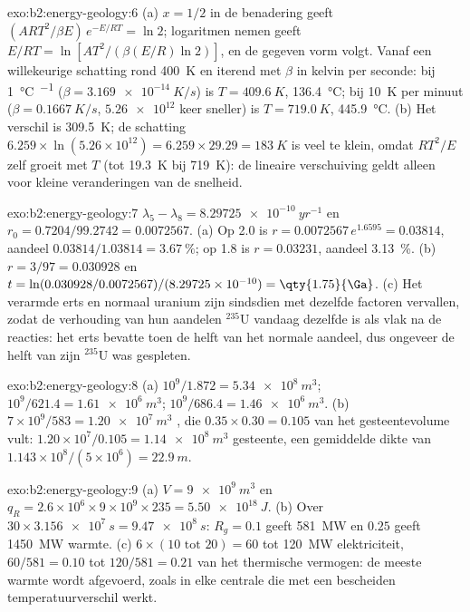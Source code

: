 \begin{solution}{exo:b2:energy-geology:6}
(a) $x = 1/2$ in de benadering geeft $(ART^2/\beta E)\,e^{-E/RT} = \ln 2$; logaritmen nemen geeft
$E/RT = \ln[AT^2/(\beta(E/R)\ln 2)]$, en de gegeven vorm volgt. Vanaf een willekeurige schatting rond
\qty{400}{K} en iterend met $\beta$ in kelvin per seconde: bij \qty{1}{\celsius\per\Myr}
($\beta = \qty{3.169e-14}{K/s}$) is $T = \qty{409.6}{K}$, \qty{136.4}{\celsius}; bij \qty{10}{K} per
minuut ($\beta = \qty{0.1667}{K/s}$, $\num{5.26e12}$ keer sneller) is $T = \qty{719.0}{K}$,
\qty{445.9}{\celsius}. (b) Het verschil is \qty{309.5}{K}; de schatting $6.259 \times
\ln(5.26 \times 10^{12}) = 6.259 \times 29.29 = \qty{183}{K}$ is veel te klein, omdat $RT^2/E$
zelf groeit met $T$ (tot \qty{19.3}{K} bij \qty{719}{K}): de lineaire verschuiving geldt alleen voor kleine
veranderingen van de snelheid.
\end{solution}

\begin{solution}{exo:b2:energy-geology:7}
$\lambda_5 - \lambda_8 = \qty{8.29725e-10}{yr^{-1}}$ en $r_0 = 0.7204/99.2742 = 0.0072567$.
(a) Op \qty{2.0}{\Ga} is $r = 0.0072567\,e^{1.6595} = 0.03814$, aandeel $0.03814/1.03814 =
\qty{3.67}{\percent}$; op \qty{1.8}{\Ga} is $r = 0.03231$, aandeel \qty{3.13}{\percent}. (b) $r =
3/97 = 0.030928$ en $t = \ln(0.030928/0.0072567)/(8.29725 \times 10^{-10}) = \qty{1.75}{\Ga}$.
(c) Het verarmde erts en normaal uranium zijn sindsdien met dezelfde factoren vervallen, zodat de verhouding van
hun aandelen $^{235}$U vandaag dezelfde is als vlak na de reacties: het erts bevatte toen de helft van het
normale aandeel, dus ongeveer de helft van zijn $^{235}$U was gespleten.
\end{solution}

\begin{solution}{exo:b2:energy-geology:8}
(a) $10^9/1.872 = \qty{5.34e8}{m^3}$; $10^9/621.4 = \qty{1.61e6}{m^3}$; $10^9/686.4 =
\qty{1.46e6}{m^3}$. (b) $7 \times 10^9/583 = \qty{1.20e7}{m^3}$ , die
$0.35 \times 0.30 = 0.105$ van het gesteentevolume vult: $1.20 \times 10^7/0.105 = \qty{1.14e8}{m^3}$ gesteente,
een gemiddelde dikte van $1.143 \times 10^8/(5 \times 10^6) = \qty{22.9}{m}$.
\end{solution}

\begin{solution}{exo:b2:energy-geology:9}
(a) $V = \qty{9e9}{m^3}$ en $q_R = 2.6 \times 10^6 \times 9 \times 10^9 \times 235 =
\qty{5.50e18}{J}$. (b) Over $30 \times \qty{3.156e7}{s} = \qty{9.47e8}{s}$: $R_g = 0.1$ geeft
\qty{581}{MW} en $0.25$ geeft \qty{1450}{MW} warmte. (c) $6 \times (10 \text{ tot } 20) = 60$ tot
\qty{120}{MW} elektriciteit, $60/581 = 0.10$ tot $120/581 = 0.21$ van het thermische vermogen: de meeste
warmte wordt afgevoerd, zoals in elke centrale die met een bescheiden temperatuurverschil werkt.
\end{solution}

